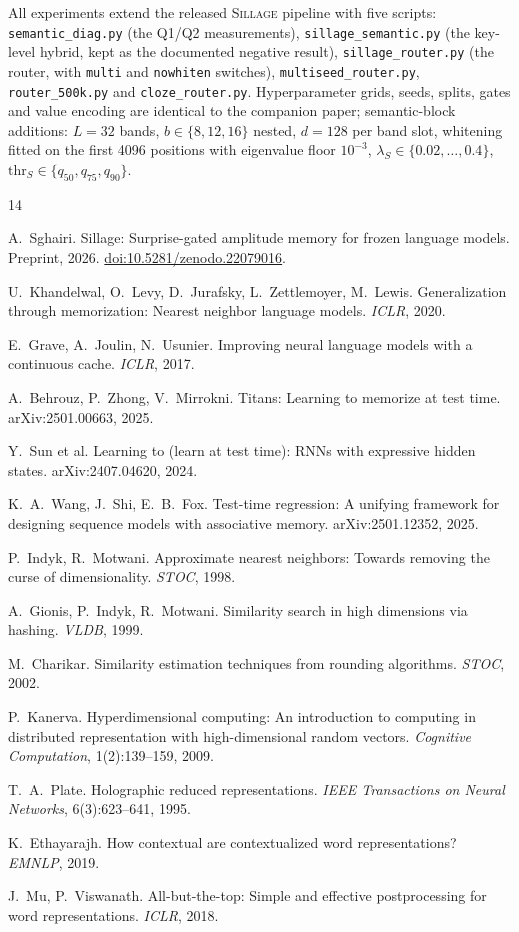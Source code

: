 \documentclass[11pt]{article}
\newcommand{\sillage}{\textsc{Sillage}}
\begin{document}
All experiments extend the released \sillage{} pipeline with five scripts: \texttt{semantic\_diag.py} (the Q1/Q2 measurements), \texttt{sillage\_semantic.py} (the key-level hybrid, kept as the documented negative result), \texttt{sillage\_router.py} (the router, with \texttt{multi} and \texttt{nowhiten} switches), \texttt{multiseed\_router.py}, \texttt{router\_500k.py} and \texttt{cloze\_router.py}. Hyperparameter grids, seeds, splits, gates and value encoding are identical to the companion paper; semantic-block additions: $L = 32$ bands, $b \in \{8,12,16\}$ nested, $d = 128$ per band slot, whitening fitted on the first 4096 positions with eigenvalue floor $10^{-3}$, $\lambda_S \in \{0.02,\dots,0.4\}$, $\text{thr}_S \in \{q_{50}, q_{75}, q_{90}\}$.

\begin{thebibliography}{14}\small

 A.~Sghairi. Sillage: Surprise-gated amplitude memory for frozen language models. Preprint, 2026. \href{https://doi.org/10.5281/zenodo.22079016}{doi:10.5281/zenodo.22079016}.

 U.~Khandelwal, O.~Levy, D.~Jurafsky, L.~Zettlemoyer, M.~Lewis. Generalization through memorization: Nearest neighbor language models. \emph{ICLR}, 2020.

 E.~Grave, A.~Joulin, N.~Usunier. Improving neural language models with a continuous cache. \emph{ICLR}, 2017.

 A.~Behrouz, P.~Zhong, V.~Mirrokni. Titans: Learning to memorize at test time. arXiv:2501.00663, 2025.

 Y.~Sun et al. Learning to (learn at test time): RNNs with expressive hidden states. arXiv:2407.04620, 2024.

 K.~A.~Wang, J.~Shi, E.~B.~Fox. Test-time regression: A unifying framework for designing sequence models with associative memory. arXiv:2501.12352, 2025.

 P.~Indyk, R.~Motwani. Approximate nearest neighbors: Towards removing the curse of dimensionality. \emph{STOC}, 1998.

 A.~Gionis, P.~Indyk, R.~Motwani. Similarity search in high dimensions via hashing. \emph{VLDB}, 1999.

 M.~Charikar. Similarity estimation techniques from rounding algorithms. \emph{STOC}, 2002.

 P.~Kanerva. Hyperdimensional computing: An introduction to computing in distributed representation with high-dimensional random vectors. \emph{Cognitive Computation}, 1(2):139--159, 2009.

 T.~A.~Plate. Holographic reduced representations. \emph{IEEE Transactions on Neural Networks}, 6(3):623--641, 1995.

 K.~Ethayarajh. How contextual are contextualized word representations? \emph{EMNLP}, 2019.

 J.~Mu, P.~Viswanath. All-but-the-top: Simple and effective postprocessing for word representations. \emph{ICLR}, 2018.

\end{thebibliography}
\end{document}
